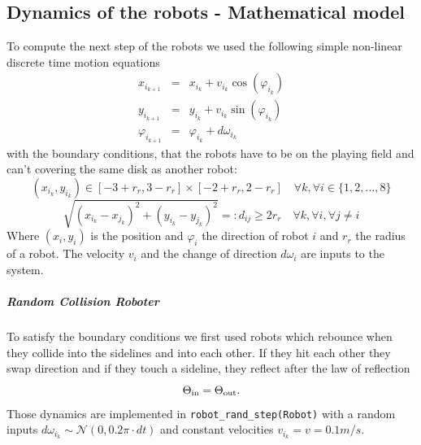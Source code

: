 \subsection*{Dynamics of the robots - Mathematical model}
To compute the next step of the robots we used the following simple non-linear discrete time motion equations
\begin{eqnarray}
	x_{i_{k+1}} &=& x_{i_{k}} + v_{i_{k}} \cos(\varphi_{i_{k}}) 	\label{robot_motion_first} \\
	y_{i_{k+1}} &=& y_{i_{k}} + v_{i_{k}} \sin(\varphi_{i_{k}}) \\
	\varphi_{i_{k+1}} &=& \varphi_{i_{k}} + d\omega_{i_k}
	\label{robot_motion_last}
\end{eqnarray}
with the boundary conditions, that the robots have to be on the playing field and can't covering the same disk as another robot:
	\[ (x_{i_{k}},y_{i_{k}}) \in [-3+r_r,3-r_r]\times[-2+r_r,2-r_r] \quad \forall k, \forall i\in \{1,2,\ldots,8 \}
	\]
	\[ \sqrt{(x_{i_{k}}-x_{j_{k}})^2 + (y_{i_{k}}-y_{j_{k}})^2} =: d_{ij} \geq 2r_r \quad \forall k, \forall i, \forall j\neq i
	\]
Where $(x_i,y_i)$ is the position and $\varphi_i$ the direction of robot $i$ and $r_r$ the radius of a robot. The velocity $v_i$ and the change of direction $d\omega_i$ are inputs to the system.

%

\subparagraph{Random Collision Roboter} To satisfy the boundary conditions we first used robots which rebounce when they collide into the sidelines and into each other. If they hit each other they swap direction 
%
and if they touch a sideline, they reflect after the law of reflection 
\[ \Theta_{\textnormal{in}} = \Theta_{\textnormal{out}}.
\]
Those dynamics are implemented in \texttt{robot\_rand\_step(Robot)} with a random inputs $d\omega_{i_k} \sim \mathcal{N}(0,0.2\pi \cdot dt)$ and constant velocities $v_{i_k} = v = 0.1 m/s$.\\

